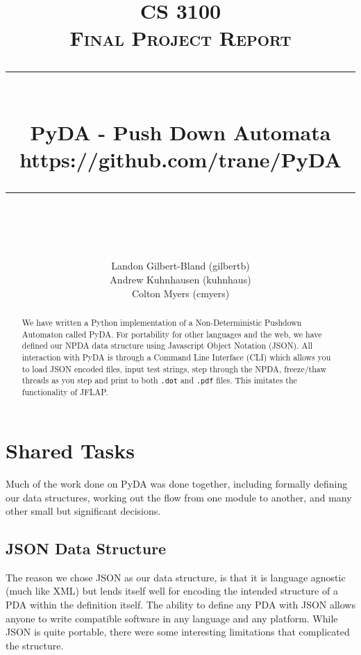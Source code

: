 \documentclass[a4paper]{article}
\newcommand{\HRule}{\rule{\linewidth}{0.5mm}}
\begin{document}
\title{ %
    \textsc{\LARGE CS 3100}\\[1.5cm]
    \textsc{\Large Final Project Report}\\[0.5cm]
    \HRule \\[0.4cm]
    { \huge \bfseries PyDA - Push Down Automata}\\
    { \small https://github.com/trane/PyDA }\\
    \HRule \\[1.5cm]
}
\author{
    Landon Gilbert-Bland (gilbertb)\\ %
    Andrew Kuhnhausen (kuhnhaus)\\%
    Colton Myers (cmyers)\\%
}
\maketitle
\newpage
\tableofcontents
\newpage
\begin{abstract}
We have written a Python implementation of a Non-Deterministic Pushdown
Automaton called PyDA. For portability for other languages and the web, we have
defined our NPDA data structure using Javascript Object Notation (JSON). All
interaction with PyDA is through a Command Line Interface (CLI) which allows you
to load JSON encoded files, input test strings, step through the NPDA,
freeze/thaw threads as you step and print to both \texttt{.dot} and
\texttt{.pdf} files.  This imitates the functionality of JFLAP.
\end{abstract}
\newpage
\setcounter{secnumdepth}{3}

\section{Shared Tasks}\label{ch:Shared Tasks}
Much of the work done on PyDA was done together, including formally defining our
data structures, working out the flow from one module to another, and many other
small but significant decisions.
\subsection{JSON Data Structure}
The reason we chose JSON as our data structure, is that it is language agnostic
(much like XML) but lends itself well for encoding the intended structure of a
PDA within the definition itself. The ability to define any PDA with JSON allows
anyone to write compatible software in any language and any platform. While JSON
is quite portable, there were some interesting limitations that complicated the
structure.
\end{document}
